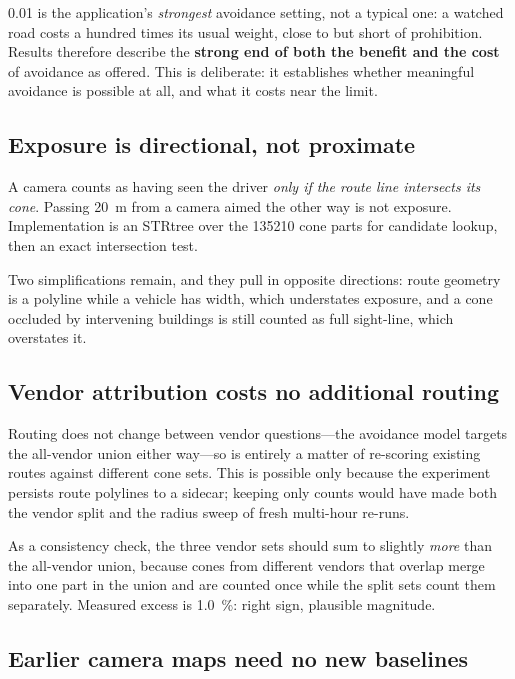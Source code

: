\documentclass[11pt,twoside]{article}
\begin{document}
\num{0.01} is the application's \emph{strongest} avoidance setting, not a typical one: a
watched road costs a hundred times its usual weight, close to but short of prohibition.
Results therefore describe the \textbf{strong end of both the benefit and the cost} of
avoidance as offered. This is deliberate: it establishes whether meaningful avoidance is
possible at all, and what it costs near the limit.

\subsection{Exposure is directional, not proximate}

A camera counts as having seen the driver \emph{only if the route line intersects its
cone}. Passing \SI{20}{\metre} from a camera aimed the other way is not exposure.
Implementation is an STRtree over the \num{135210} cone parts for candidate lookup, then
an exact intersection test.

Two simplifications remain, and they pull in opposite directions: route geometry is a
polyline while a vehicle has width, which understates exposure, and a cone occluded by
intervening buildings is still counted as full sight-line, which overstates it.

\subsection{Vendor attribution costs no additional routing}

Routing does not change between vendor questions---the avoidance model targets the
all-vendor union either way---so  is entirely a matter of
re-scoring existing routes against different cone sets. This is possible only because the
experiment persists route polylines to a sidecar; keeping only counts would have made both
the vendor split and the radius sweep of  fresh multi-hour re-runs.

As a consistency check, the three vendor sets should sum to slightly \emph{more} than the
all-vendor union, because cones from different vendors that overlap merge into one part in
the union and are counted once while the split sets count them separately. Measured excess
is \SI{1.0}{\percent}: right sign, plausible magnitude.

\subsection{Earlier camera maps need no new baselines}
\label{sec:method:history}
\end{document}
